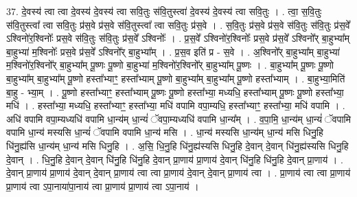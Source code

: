 \documentclass[17pt]{extarticle}
\begin{document}
37. दे॒वस्य॑ त्वा त्वा दे॒वस्य॑ दे॒वस्य॑ त्वा सवि॒तुः स॑वि॒तुस्त्वा॑ दे॒वस्य॑ दे॒वस्य॑ त्वा सवि॒तुः । . त्वा॒ स॒वि॒तुः स॑वि॒तुस्त्वा᳚ त्वा सवि॒तुः प्र॑स॒वे प्र॑स॒वे स॑वि॒तुस्त्वा᳚ त्वा सवि॒तुः प्र॑स॒वे । . स॒वि॒तुः प्र॑स॒वे प्र॑स॒वे स॑वि॒तुः स॑वि॒तुः प्र॑स॒वे᳚ ऽश्विनो॑र॒श्विनोः᳚ प्रस॒वे स॑वि॒तुः स॑वि॒तुः प्र॑स॒वे᳚ ऽश्विनोः᳚ । . प्र॒स॒वे᳚ ऽश्विनो॑र॒श्विनोः᳚ प्रस॒वे प्र॑स॒वे᳚ ऽश्विनो᳚र् बा॒हुभ्या᳚म् बा॒हुभ्या॑ म॒श्विनोः᳚ प्रस॒वे प्र॑स॒वे᳚ ऽश्विनो᳚र् बा॒हुभ्या᳚म् । . प्र॒स॒व इति॑ प्र - स॒वे । . अ॒श्विनो᳚र् बा॒हुभ्या᳚म् बा॒हुभ्या॑ म॒श्विनो॑र॒श्विनो᳚र् बा॒हुभ्या᳚म् पू॒ष्णः पू॒ष्णो बा॒हुभ्या॑ म॒श्विनो॑र॒श्विनो᳚र् बा॒हुभ्या᳚म् पू॒ष्णः । . बा॒हुभ्या᳚म् पू॒ष्णः पू॒ष्णो बा॒हुभ्या᳚म् बा॒हुभ्या᳚म् पू॒ष्णो हस्ता᳚भ्याꣳ॒॒ हस्ता᳚भ्याम् पू॒ष्णो बा॒हुभ्या᳚म् बा॒हुभ्या᳚म् पू॒ष्णो हस्ता᳚भ्याम् । . बा॒हुभ्या॒मिति॑ बा॒हु - भ्या॒म् । . पू॒ष्णो हस्ता᳚भ्याꣳ॒॒ हस्ता᳚भ्याम् पू॒ष्णः पू॒ष्णो हस्ता᳚भ्या॒ मध्यधि॒ हस्ता᳚भ्याम् पू॒ष्णः पू॒ष्णो 
हस्ता᳚भ्या॒ मधि॑ । . हस्ता᳚भ्या॒ मध्यधि॒ हस्ता᳚भ्याꣳ॒॒ हस्ता᳚भ्या॒ मधि॑ वपामि वपा॒म्यधि॒ हस्ता᳚भ्याꣳ॒॒ हस्ता᳚भ्या॒ मधि॑ वपामि । . अधि॑ वपामि वपा॒म्यध्यधि॑ वपामि धा॒न्य॑म् धा॒न्यं॑ ॅवपा॒म्यध्यधि॑ वपामि धा॒न्य᳚म् । . व॒पा॒मि॒ धा॒न्य॑म् धा॒न्यं॑ ॅवपामि वपामि धा॒न्य॑ मस्यसि धा॒न्यं॑ ॅवपामि वपामि धा॒न्य॑ मसि । . धा॒न्य॑ मस्यसि धा॒न्य॑म् धा॒न्य॑ मसि धिनु॒हि धि॑नु॒ह्य॑सि धा॒न्य॑म् धा॒न्य॑ मसि धिनु॒हि । . अ॒सि॒ धि॒नु॒हि धि॑नु॒ह्य॑स्यसि धिनु॒हि दे॒वान् दे॒वान् धि॑नु॒ह्य॑स्यसि धिनु॒हि दे॒वान् । . धि॒नु॒हि दे॒वान् दे॒वान् धि॑नु॒हि धि॑नु॒हि दे॒वान् प्रा॒णाय॑ प्रा॒णाय॑ दे॒वान् धि॑नु॒हि धि॑नु॒हि दे॒वान् प्रा॒णाय॑ । . दे॒वान् प्रा॒णाय॑ प्रा॒णाय॑ दे॒वान् दे॒वान् प्रा॒णाय॑ त्वा त्वा प्रा॒णाय॑ दे॒वान् दे॒वान् प्रा॒णाय॑ त्वा । . प्रा॒णाय॑ त्वा त्वा प्रा॒णाय॑ प्रा॒णाय॑ त्वा ऽपा॒नाया॑पा॒नाय॑ त्वा प्रा॒णाय॑ प्रा॒णाय॑ त्वा ऽपा॒नाय॑ । \newline
\end{document}
